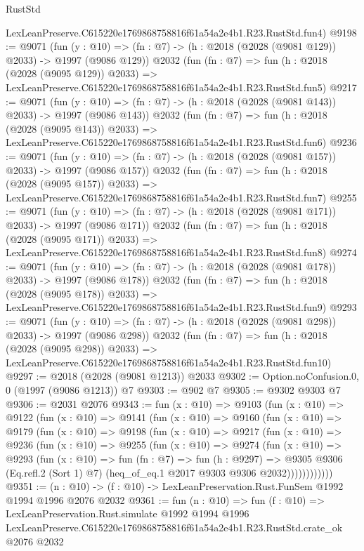 \begin{lexlean}{RustStd}
\begin{coremodule}
    LexLeanPreserve.C615220e1769868758816f61a54a2e4b1.R23.RustStd.fun4)
@9198 := @9071
    (fun (y : @10) => (fn : @7) -> (h : @2018 (@2028 (@9081 @129)) @2033) -> @1997 (@9086 @129))
    @2032
    (fun (fn : @7) =>
    fun (h : @2018 (@2028 (@9095 @129)) @2033) =>
    LexLeanPreserve.C615220e1769868758816f61a54a2e4b1.R23.RustStd.fun5)
@9217 := @9071
    (fun (y : @10) => (fn : @7) -> (h : @2018 (@2028 (@9081 @143)) @2033) -> @1997 (@9086 @143))
    @2032
    (fun (fn : @7) =>
    fun (h : @2018 (@2028 (@9095 @143)) @2033) =>
    LexLeanPreserve.C615220e1769868758816f61a54a2e4b1.R23.RustStd.fun6)
@9236 := @9071
    (fun (y : @10) => (fn : @7) -> (h : @2018 (@2028 (@9081 @157)) @2033) -> @1997 (@9086 @157))
    @2032
    (fun (fn : @7) =>
    fun (h : @2018 (@2028 (@9095 @157)) @2033) =>
    LexLeanPreserve.C615220e1769868758816f61a54a2e4b1.R23.RustStd.fun7)
@9255 := @9071
    (fun (y : @10) => (fn : @7) -> (h : @2018 (@2028 (@9081 @171)) @2033) -> @1997 (@9086 @171))
    @2032
    (fun (fn : @7) =>
    fun (h : @2018 (@2028 (@9095 @171)) @2033) =>
    LexLeanPreserve.C615220e1769868758816f61a54a2e4b1.R23.RustStd.fun8)
@9274 := @9071
    (fun (y : @10) => (fn : @7) -> (h : @2018 (@2028 (@9081 @178)) @2033) -> @1997 (@9086 @178))
    @2032
    (fun (fn : @7) =>
    fun (h : @2018 (@2028 (@9095 @178)) @2033) =>
    LexLeanPreserve.C615220e1769868758816f61a54a2e4b1.R23.RustStd.fun9)
@9293 := @9071
    (fun (y : @10) => (fn : @7) -> (h : @2018 (@2028 (@9081 @298)) @2033) -> @1997 (@9086 @298))
    @2032
    (fun (fn : @7) =>
    fun (h : @2018 (@2028 (@9095 @298)) @2033) =>
    LexLeanPreserve.C615220e1769868758816f61a54a2e4b1.R23.RustStd.fun10)
@9297 := @2018 (@2028 (@9081 @1213)) @2033
@9302 := Option.noConfusion.{0, 0} (@1997 (@9086 @1213)) @7
@9303 := @902 @7
@9305 := @9302 @9303 @7
@9306 := @2031 @2076
@9343 := fun (x : @10) =>
  @9103
    (fun (x : @10) =>
    @9122
      (fun (x : @10) =>
      @9141
        (fun (x : @10) =>
        @9160
          (fun (x : @10) =>
          @9179
            (fun (x : @10) =>
            @9198
              (fun (x : @10) =>
              @9217
                (fun (x : @10) =>
                @9236
                  (fun (x : @10) =>
                  @9255
                    (fun (x : @10) =>
                    @9274
                      (fun (x : @10) =>
                      @9293
                        (fun (x : @10) =>
                        fun (fn : @7) =>
                        fun (h : @9297) =>
                        @9305
                          @9306
                          (Eq.refl.{2} (Sort 1) @7)
                          (heq_of_eq.{1} @2017 @9303 @9306 @2032))))))))))))
@9351 := (n : @10) -> (f : @10) -> LexLeanPreservation.Rust.FunSem @1992 @1994 @1996 @2076 @2032
@9361 := fun (n : @10) =>
  fun (f : @10) =>
  LexLeanPreservation.Rust.simulate
    @1992
    @1994
    @1996
    LexLeanPreserve.C615220e1769868758816f61a54a2e4b1.R23.RustStd.crate_ok
    @2076
    @2032
\end{coremodule}
\end{lexlean}
